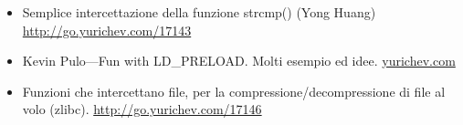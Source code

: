 \begin{itemize}

\item
Semplice intercettazione della funzione strcmp() (Yong Huang) 
\url{http://go.yurichev.com/17143}

\item
Kevin Pulo---Fun with LD\_PRELOAD. Molti esempio ed idee.
\href{http://go.yurichev.com/17145}{yurichev.com}

\item
Funzioni che intercettano file, per la compressione/decompressione di file al volo (zlibc). \url{http://go.yurichev.com/17146}

\end{itemize}
